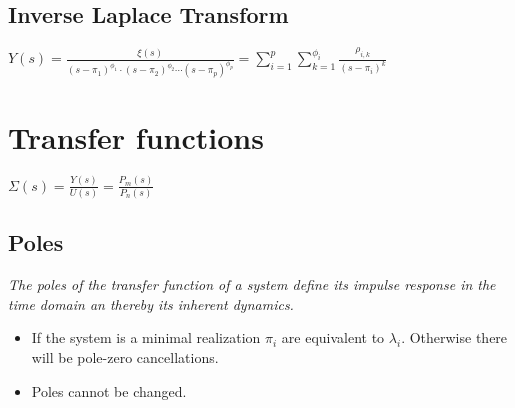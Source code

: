 \documentclass[10pt,a4paper]{scrartcl}
\begin{document}
\begin{multicols*}{3}
	\finn
		
	
	\subsection*{Inverse Laplace Transform}
	
	$Y(s)=\frac{\xi(s)}{(s-\pi_1)^{\phi_1}\cdot(s-\pi_2)^{\phi_2}\cdots(s-\pi_p)^{\phi_p}}=\sum\limits_{i=1}^{p}\sum\limits_{k=1}^{\phi_i}\frac{\rho_{i,k}}{(s-\pi_i)^k}$
	
	\finn	
	
	\large
	\begin{center}
	

	\finn	
	
	\end{center}
	\normalsize
	
	\finn	
	
	
	
	\section{Transfer functions}

	$\Sigma(s)=\frac{Y(s)}{U(s)}=\frac{P_m(s)}{P_n(s)}$
	
	\subsection{Poles}
	
	\emph{The poles of the transfer function of a system define its impulse response in the time domain an thereby its inherent dynamics.}
	
	\begin{center}
	\end{center}
	
	\begin{itemize}
	\compaq
	\item
	If the system is a minimal realization $\pi_i$ are equivalent to $\lambda_i$. Otherwise there will be pole-zero cancellations.
	\item
	Poles cannot be changed.
	\end{itemize}
	
	
	

\end{multicols*}
\end{document}
